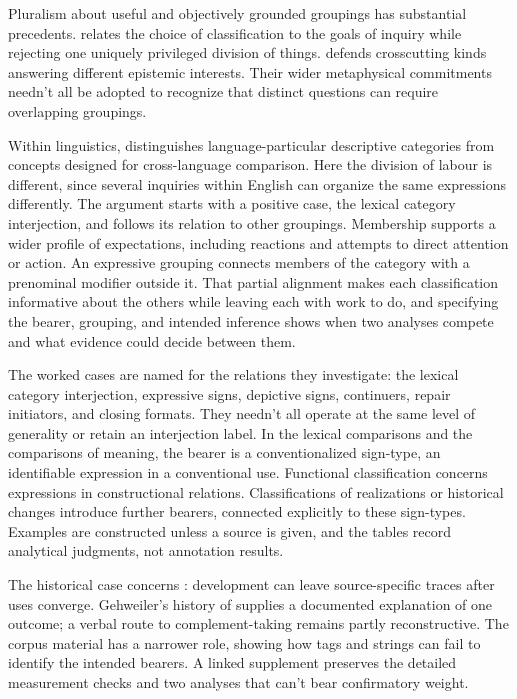 \documentclass[12pt]{article}
\begin{document}
Pluralism about useful and objectively grounded groupings has substantial
precedents. \textcite[5--7, 17--18]{dupre1993disorder} relates the choice of
classification to the goals of inquiry while rejecting one uniquely
privileged division of things. \textcite[63--64, 69--72]{khalidi2013}
defends crosscutting kinds answering different epistemic interests.
Their wider metaphysical commitments needn't all be adopted to recognize
that distinct questions can require overlapping groupings.

Within linguistics, \textcite[663, 666, 680]{haspelmath2010} distinguishes
language-particular descriptive categories from concepts designed for
cross-language comparison. Here the division of labour is different, since
several inquiries within English can organize the same expressions
differently. The argument starts with a positive case, the lexical
category interjection, and follows its relation to other groupings.
Membership supports a wider profile of expectations, including reactions
and attempts to direct attention or action. An expressive grouping connects
members of the category with a prenominal modifier outside it. That partial
alignment makes each classification informative about the others while
leaving each with work to do, and specifying the bearer, grouping, and
intended inference shows when two analyses compete and what evidence could
decide between them.

The worked cases are named for the relations they investigate: the
lexical category interjection, expressive signs, depictive signs, continuers, repair
initiators, and closing formats. They needn't all operate at the same level
of generality or retain an interjection label. In the lexical comparisons
and the comparisons of meaning, the bearer is a conventionalized sign-type,
an identifiable expression in a conventional use. Functional classification
concerns expressions in constructional relations. Classifications of
realizations or historical changes introduce further bearers, connected
explicitly to these sign-types. Examples are constructed unless a source is
given, and the tables record analytical judgments, not annotation results.

The historical case concerns : development can leave
source-specific traces after uses converge. Gehweiler's history of
 supplies a documented explanation of one outcome; a verbal
route to complement-taking  remains partly reconstructive.
The corpus material has a narrower role, showing how tags and strings
can fail to identify the intended bearers. A linked supplement preserves
the detailed measurement checks and two analyses that can't bear
confirmatory weight.
\end{document}
